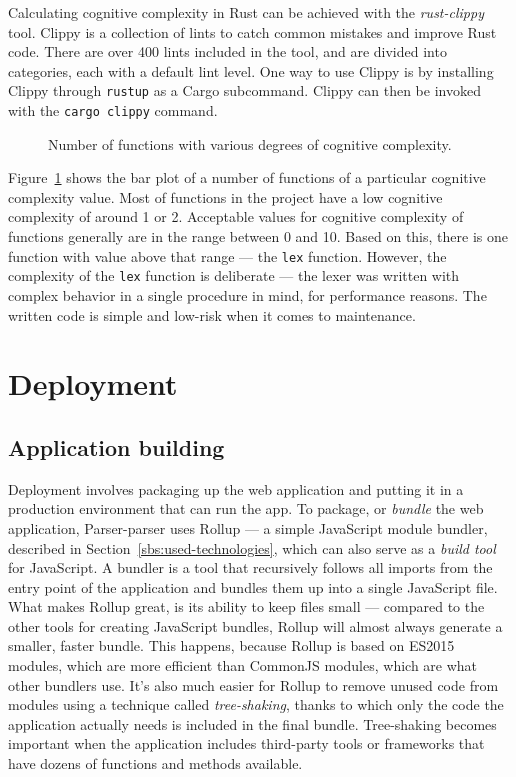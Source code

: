\documentclass[english,bachelors,forcepolishlogotype]{wizthesis}
\newcommand{\thisproject}{Parser-parser}
\begin{document}
Calculating cognitive complexity in Rust can be achieved with the
\emph{rust-clippy} tool. Clippy is a collection of lints to catch common
mistakes and improve Rust code. There are over 400 lints included in the tool,
and are divided into categories, each with a default lint level. One way to use
Clippy is by installing Clippy through \texttt{rustup} as a Cargo subcommand.
Clippy can then be invoked with the \texttt{cargo clippy} command.

\begin{figure}[H]
  \centering
  
  \caption{Number of functions with various degrees of cognitive complexity.}
  \label{fig:cognitive-complexity}
\end{figure}

Figure~\ref{fig:cognitive-complexity} shows the bar plot of a number of
functions of a particular cognitive complexity value. Most of functions in the
project have a low cognitive complexity of around 1 or 2. Acceptable values for
cognitive complexity of functions generally are in the range between 0 and 10.
Based on this, there is one function with value above that range --- the
\texttt{lex} function. However, the complexity of the \texttt{lex} function is
deliberate --- the lexer was written with complex behavior in a single procedure
in mind, for performance reasons. The written code is simple and low-risk when
it comes to maintenance.

\newpage

\chapter{Deployment} \label{ch:deployment}

\section{Application building}

Deployment involves packaging up the web application and putting it in a
production environment that can run the app. To package, or \emph{bundle} the
web application, \thisproject{} uses Rollup --- a simple JavaScript module
bundler, described in Section~\ref{sbs:used-technologies}, which can also serve
as a \emph{build tool} for JavaScript. A bundler is a tool that recursively
follows all imports from the entry point of the application and bundles them up
into a single JavaScript file. What makes Rollup great, is its ability to keep
files small --- compared to the other tools for creating JavaScript bundles,
Rollup will almost always generate a smaller, faster bundle. This happens,
because Rollup is based on ES2015 modules, which are more efficient than
CommonJS modules, which are what other bundlers use. It's also much easier for
Rollup to remove unused code from modules using a technique called
\emph{tree-shaking}, thanks to which only the code the application actually
needs is included in the final bundle. Tree-shaking becomes important when the
application includes third-party tools or frameworks that have dozens of
functions and methods available.
\end{document}

